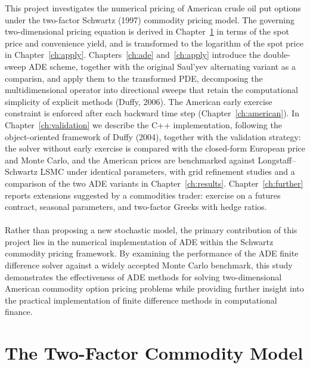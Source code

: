 \documentclass[12pt,a4paper]{article}
\begin{document}
This project investigates the numerical pricing of American crude oil put options under the two-factor Schwartz (1997) commodity pricing model. The governing two-dimensional pricing equation is derived in Chapter~\ref{ch:model} in terms of the spot price and convenience yield, and is transformed to the logarithm of the spot price in Chapter~\ref{ch:apply}. Chapters~\ref{ch:ade} and~\ref{ch:apply} introduce the double-sweep ADE scheme, together with the original Saul'yev alternating variant as a comparisn, and apply them to the transformed PDE, decomposing the multidimensional operator into directional sweeps that retain the computational simplicity of explicit methods (Duffy, 2006). The American early exercise constraint is enforced after each backward time step (Chapter~\ref{ch:american}). In Chapter~\ref{ch:validation} we describe the C++ implementation, following the object-oriented framework of Duffy (2004), together with the validation strategy: the solver without early exercise is compared with the closed-form European price and Monte Carlo, and the American prices are benchmarked against Longstaff--Schwartz LSMC under identical parameters, with grid refinement studies and a comparison of the two ADE variants in Chapter~\ref{ch:results}. Chapter~\ref{ch:further} reports extensions suggested by a commodities trader: exercise on a futures contract, seasonal parameters, and two-factor Greeks with hedge ratios.\\\\
Rather than proposing a new stochastic model, the primary contribution of this project lies in the numerical implementation of ADE within the Schwartz commodity pricing framework. By examining the performance of the ADE finite difference solver against a widely accepted Monte Carlo benchmark, this study demonstrates the effectiveness of ADE methods for solving two-dimensional American commodity option pricing problems while providing further insight into the practical implementation of finite difference methods in computational finance.

\newpage

\section{The Two-Factor Commodity Model}\label{ch:model}
\end{document}
